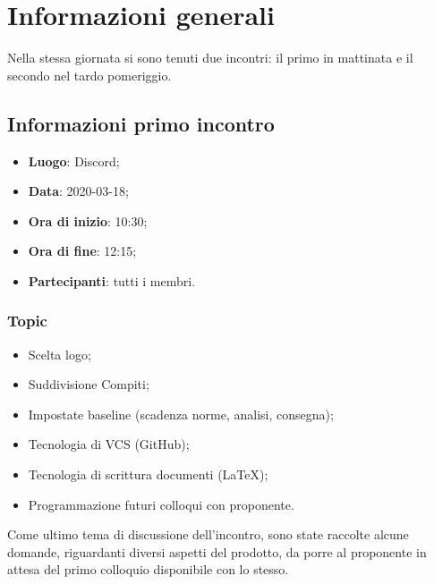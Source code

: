 \section{Informazioni generali}
Nella stessa giornata si sono tenuti due incontri: il primo in mattinata e il secondo nel tardo pomeriggio.
\subsection{Informazioni primo incontro}
\begin{itemize}
\item \textbf{Luogo}: Discord\glo;
\item \textbf{Data}: 2020-03-18;
\item \textbf{Ora di inizio}: 10:30;
\item \textbf{Ora di fine}: 12:15;
\item \textbf{Partecipanti}: tutti i membri.
\end{itemize}

\subsubsection{Topic}

\begin{itemize}
\item Scelta logo;
\item Suddivisione Compiti;
\item Impostate baseline (scadenza norme, analisi, consegna);
\item Tecnologia di VCS (GitHub);
\item Tecnologia di scrittura documenti (LaTeX);
\item Programmazione futuri colloqui con proponente.
\end{itemize}

Come ultimo tema di discussione dell'incontro, sono state raccolte alcune domande, riguardanti diversi aspetti del prodotto, da porre al proponente in attesa del primo colloquio disponibile con lo stesso. 

